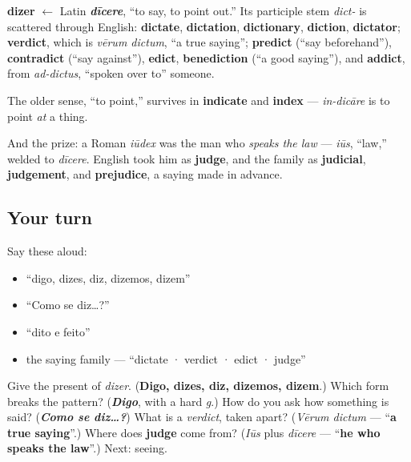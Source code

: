\begin{cousinweb}
\textbf{dizer} $\leftarrow$ Latin \emph{\textbf{dīcere}}, \textquotedblleft{}to say, to point out.\textquotedblright{} Its participle stem \emph{dict-} is scattered through English: \textbf{dictate}, \textbf{dictation}, \textbf{dictionary}, \textbf{diction}, \textbf{dictator}; \textbf{verdict}, which is \emph{vērum dictum}, \textquotedblleft{}a true saying\textquotedblright{}; \textbf{predict} (\textquotedblleft{}say beforehand\textquotedblright{}), \textbf{contradict} (\textquotedblleft{}say against\textquotedblright{}), \textbf{edict}, \textbf{benediction} (\textquotedblleft{}a good saying\textquotedblright{}), and \textbf{addict}, from \emph{ad-dictus}, \textquotedblleft{}spoken over to\textquotedblright{} someone.

The older sense, \textquotedblleft{}to point,\textquotedblright{} survives in \textbf{indicate} and \textbf{index} — \emph{in-dicāre} is to point \emph{at} a thing.

And the prize: a Roman \emph{iūdex} was the man who \emph{speaks the law} — \emph{iūs}, \textquotedblleft{}law,\textquotedblright{} welded to \emph{dīcere}. English took him as \textbf{judge}, and the family as \textbf{judicial}, \textbf{judgement}, and \textbf{prejudice}, a saying made in advance.
\end{cousinweb}

\subsection*{Your turn}
Say these aloud:

\begin{itemize}
\raggedright
  \item \textquotedblleft{}digo, dizes, diz, dizemos, dizem\textquotedblright{}
  \item \textquotedblleft{}Como se diz…?\textquotedblright{}
  \item \textquotedblleft{}dito e feito\textquotedblright{}
  \item the saying family — \textquotedblleft{}dictate · verdict · edict · judge\textquotedblright{}
\end{itemize}

\begin{tcolorbox}[breakable,colback=teal!4,colframe=teal!35!black,title={Before you move on}]
Give the present of \emph{dizer}. (\textbf{Digo, dizes, diz, dizemos, dizem}.) Which form breaks the pattern? (\emph{\textbf{Digo}}, with a hard \emph{g}.) How do you ask how something is said? (\emph{\textbf{Como se diz…?}}) What is a \emph{verdict}, taken apart? (\emph{Vērum dictum} — \textquotedblleft{}\textbf{a true saying}\textquotedblright{}.) Where does \textbf{judge} come from? (\emph{Iūs} plus \emph{dīcere} — \textquotedblleft{}\textbf{he who speaks the law}\textquotedblright{}.) Next: seeing.
\end{tcolorbox}
